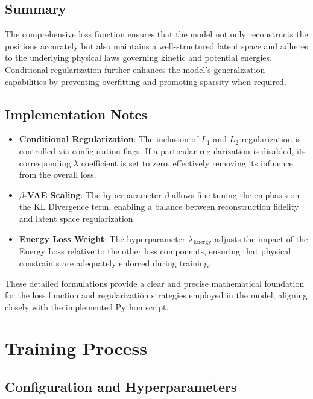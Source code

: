 \documentclass[12pt]{article}
\begin{document}
\subsection{Summary}

The comprehensive loss function ensures that the model not only reconstructs the positions accurately but also maintains a well-structured latent space and adheres to the underlying physical laws governing kinetic and potential energies. Conditional regularization further enhances the model's generalization capabilities by preventing overfitting and promoting sparsity when required.

\subsection{Implementation Notes}
\begin{itemize}
    \item \textbf{Conditional Regularization}: The inclusion of $L_1$ and $L_2$ regularization is controlled via configuration flags. If a particular regularization is disabled, its corresponding $\lambda$ coefficient is set to zero, effectively removing its influence from the overall loss.
    
    \item \textbf{$\beta$-VAE Scaling}: The hyperparameter $\beta$ allows fine-tuning the emphasis on the KL Divergence term, enabling a balance between reconstruction fidelity and latent space regularization.
    
    \item \textbf{Energy Loss Weight}: The hyperparameter $\lambda_{\text{Energy}}$ adjusts the impact of the Energy Loss relative to the other loss components, ensuring that physical constraints are adequately enforced during training.
\end{itemize}

These detailed formulations provide a clear and precise mathematical foundation for the loss function and regularization strategies employed in the model, aligning closely with the implemented Python script.



\section{Training Process}

\subsection{Configuration and Hyperparameters}
\end{document}
